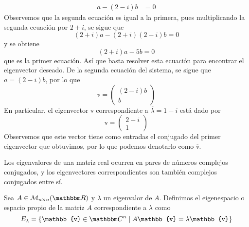 \begin{example}
\begin{align*}
        a - (2 - i)b & = 0
    \end{align*}
    Observemos que la segunda ecuación es igual a la primera, pues multiplicando la segunda ecuación por $2 + i$, se sigue que
    $$(2 + i)a - (2 + i)(2 - i)b = 0$$
    y se obtiene
    $$(2 + i)a - 5b = 0$$
    que es la primer ecuación. Así que basta resolver esta ecuación para encontrar el eigenvector deseado. De la segunda ecuación del sistema, se sigue que $a = (2 - i)b$, por lo que
    $$\mathbb{v} = \begin{pmatrix}
        (2 - i)b \\
        b
    \end{pmatrix}$$
    En particular, el eigenvector $\mathbb{v}$ correspondiente a $\overline{\lambda} = 1 - i$ está dado por
    $$\mathbb{v} = \begin{pmatrix}
        2 - i \\
        1
    \end{pmatrix}$$
    Observemos que este vector tiene como entradas el conjugado del primer eigenvector que obtuvimos, por lo que podemos denotarlo como $\overline{\mathbb{v}}$.
\end{example}

\newpage

\begin{observation}
    Los eigenvalores de una matriz real ocurren en pares de números complejos conjugados, y los eigenvectores correspondientes son también complejos conjugados entre sí.
\end{observation}

\begin{definition}
    Sea $A \in \mathcal{M}_{n \times n}(\RR)$ y $\lambda$ un eigenvalor de $A$. Definimos el eigenespacio o espacio propio de la matriz $A$ correspondiente a $\lambda$ como
    $$E_{\lambda} = \left\{ \mathbb{v} \in \CC[n] \mid A \mathbb{v} = \lambda \mathbb{v} \right\}$$
\end{definition}

